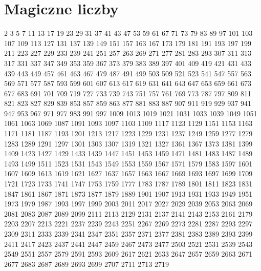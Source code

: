 \section{Magiczne liczby}

\begin{tiny}
      2      3      5      7     11     13     17     19     23     29
     31     37     41     43     47     53     59     61     67     71
     73     79     83     89     97    101    103    107    109    113
    127    131    137    139    149    151    157    163    167    173
    179    181    191    193    197    199    211    223    227    229
    233    239    241    251    257    263    269    271    277    281
    283    293    307    311    313    317    331    337    347    349
    353    359    367    373    379    383    389    397    401    409
    419    421    431    433    439    443    449    457    461    463
    467    479    487    491    499    503    509    521    523    541
    547    557    563    569    571    577    587    593    599    601
    607    613    617    619    631    641    643    647    653    659
    661    673    677    683    691    701    709    719    727    733
    739    743    751    757    761    769    773    787    797    809
    811    821    823    827    829    839    853    857    859    863
    877    881    883    887    907    911    919    929    937    941
    947    953    967    971    977    983    991    997   1009   1013
   1019   1021   1031   1033   1039   1049   1051   1061   1063   1069
   1087   1091   1093   1097   1103   1109   1117   1123   1129   1151
   1153   1163   1171   1181   1187   1193   1201   1213   1217   1223
   1229   1231   1237   1249   1259   1277   1279   1283   1289   1291
   1297   1301   1303   1307   1319   1321   1327   1361   1367   1373
   1381   1399   1409   1423   1427   1429   1433   1439   1447   1451
   1453   1459   1471   1481   1483   1487   1489   1493   1499   1511
   1523   1531   1543   1549   1553   1559   1567   1571   1579   1583
   1597   1601   1607   1609   1613   1619   1621   1627   1637   1657
   1663   1667   1669   1693   1697   1699   1709   1721   1723   1733
   1741   1747   1753   1759   1777   1783   1787   1789   1801   1811
   1823   1831   1847   1861   1867   1871   1873   1877   1879   1889
   1901   1907   1913   1931   1933   1949   1951   1973   1979   1987
   1993   1997   1999   2003   2011   2017   2027   2029   2039   2053
   2063   2069   2081   2083   2087   2089   2099   2111   2113   2129
   2131   2137   2141   2143   2153   2161   2179   2203   2207   2213
   2221   2237   2239   2243   2251   2267   2269   2273   2281   2287
   2293   2297   2309   2311   2333   2339   2341   2347   2351   2357
   2371   2377   2381   2383   2389   2393   2399   2411   2417   2423
   2437   2441   2447   2459   2467   2473   2477   2503   2521   2531
   2539   2543   2549   2551   2557   2579   2591   2593   2609   2617
   2621   2633   2647   2657   2659   2663   2671   2677   2683   2687
   2689   2693   2699   2707   2711   2713   2719
\end{tiny}

